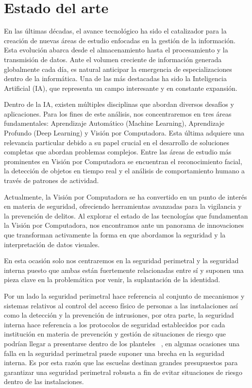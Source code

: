 \chapter{Estado del arte}

En las últimas décadas, el avance tecnológico ha sido el catalizador para la creación de nuevas áreas de estudio enfocadas en la gestión de la información. Esta evolución abarca desde el almacenamiento hasta el procesamiento y la transmisión de datos. Ante el volumen creciente de información generada globalmente cada día, es natural anticipar la emergencia de especializaciones dentro de la informática. Una de las más destacadas ha sido la Inteligencia Artificial (IA), que representa un campo interesante y en constante expansión.

Dentro de la IA, existen múltiples disciplinas que abordan diversos desafíos y aplicaciones. Para los fines de este análisis, nos concentraremos en tres áreas fundamentales: Aprendizaje Automático (Machine Learning), Aprendizaje Profundo (Deep Learning) y Visión por Computadora. Esta última adquiere una relevancia particular debido a su papel crucial en el desarrollo de soluciones completas que abordan problemas complejos. Entre las áreas de estudio más prominentes en Visión por Computadora se encuentran el reconocimiento facial, la detección de objetos en tiempo real y el análisis de comportamiento humano a través de patrones de actividad.

Actualmente, la Visión por Computadora se ha convertido en un punto de interés en materia de seguridad, ofreciendo herramientas avanzadas para la vigilancia y la prevención de delitos. Al explorar el estado de las tecnologías que fundamentan la Visión por Computadora, nos encontramos ante un panorama de innovaciones que transforman activamente la forma en que abordamos la seguridad y la interpretación de datos visuales. 


En esta ocasión solo nos centraremos en la seguridad perimetral y la seguridad interna puesto que ambas están fuertemente relacionadas entre sí y suponen una pieza clave en la problemática por venir, la suplantación de la identidad.

Por un lado la seguridad perimetral hace referencia al conjunto de mecanismos y sistemas relativos al control del acceso físico de personas a las instalaciones así como la detección y la prevención de intrusiones, por otra parte, la seguridad interna hace referencia a los protocolos de seguridad establecidos por cada institución en materia de prevención y gestión de situaciones de riesgo que podrían llegar a presentarse dentro de los planteles ~\cite{UNAMSE}, en algunas ocasiones una falla en la seguridad perimetral puede suponer una brecha en la seguridad interna. Es por esta razón que las escuelas destinan grandes presupuestos para garantizar una seguridad perimetral robusta a fin de evitar situaciones de riesgo dentro de las instalaciones.

